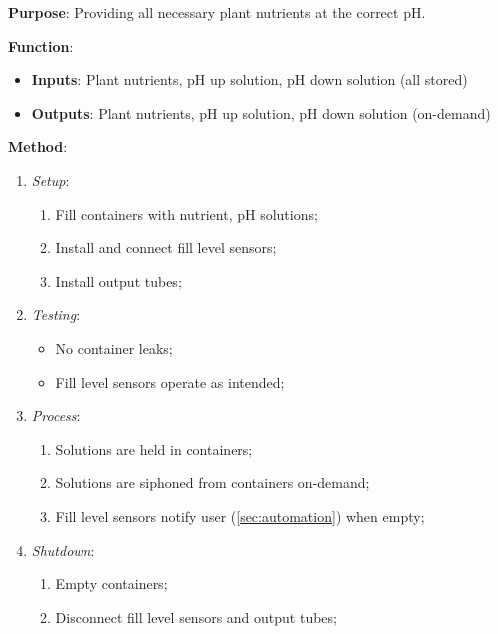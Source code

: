 \documentclass{../tex/report}
\begin{document}
\textbf{Purpose}: Providing all necessary plant nutrients at the correct pH.

\textbf{Function}:
\begin{itemize}
    \item \textbf{Inputs}: Plant nutrients, pH up solution, pH down solution (all stored)
    \item \textbf{Outputs}: Plant nutrients, pH up solution, pH down solution (on-demand)
\end{itemize}

\textbf{Method}:
\begin{enumerate}
    \item \textit{Setup}:
    \begin{enumerate}
        \item Fill containers with nutrient, pH solutions;
        \item Install and connect fill level sensors;
        \item Install output tubes;
    \end{enumerate}
    \item \textit{Testing}:
    \begin{itemize}
        \item No container leaks;
        \item Fill level sensors operate as intended;
    \end{itemize}
    \item \textit{Process}:
    \begin{enumerate}
        \item Solutions are held in containers;
        \item Solutions are siphoned from containers on-demand;
        \item Fill level sensors notify user (\ref{sec:automation}) when empty;
    \end{enumerate}
    \item \textit{Shutdown}:
    \begin{enumerate}
        \item Empty containers;
        \item Disconnect fill level sensors and output tubes;
    \end{enumerate}
\end{enumerate}
\end{document}
